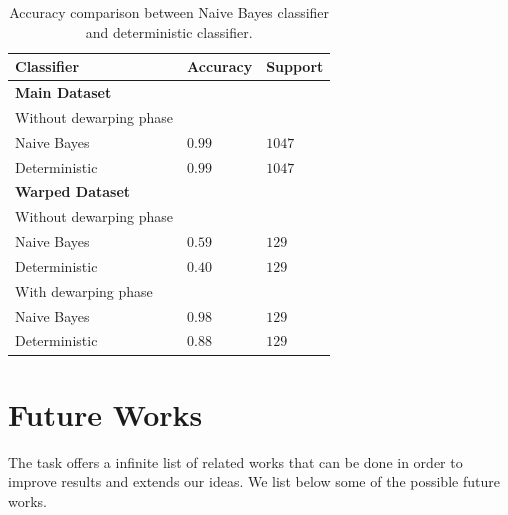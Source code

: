 \documentclass[10pt,twocolumn,letterpaper]{article}
\begin{document}
\begin{table}[!h]
  \begin{center}
    \begin{tabular}{lll}
      \hline
      Classifier              & Accuracy & Support \\ \hline
      \textbf{Main Dataset}                        \\
      \small Without dewarping phase               \\
      \; \; Naive Bayes       & $0.99$   & $1047$  \\
      \; \; Deterministic     & $0.99$   & $1047$  \\ \hline

      \textbf{Warped Dataset} &          &         \\
      \small Without dewarping phase               \\
      \; \; Naive Bayes       & $0.59$   & $129$   \\
      \; \; Deterministic     & $0.40$   & $129$   \\

      \small With dewarping phase                  \\
      \; \; Naive Bayes       & $0.98$   & $129$   \\
      \; \; Deterministic     & $0.88$   & $129$   \\ \hline
    \end{tabular}
  \end{center}
  \label{table:classifiers-comparison}
  \caption{Accuracy comparison between Naive Bayes classifier and
    deterministic classifier.}
\end{table}

\section{Future Works}
\label{sec:future-works}

The task offers a infinite list of related works that can be done in
order to improve results and extends our ideas. We list below some of
the possible future works.
\end{document}
